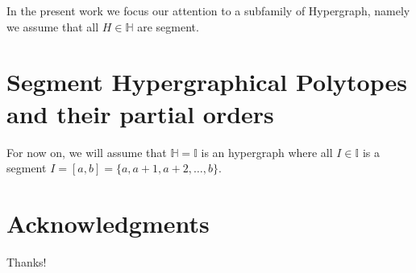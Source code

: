 \documentclass[reqno]{amsart}
\theoremstyle{definition}
\newcommand{\HH}{\mathbb H}  %
\newcommand{\II}{\mathbb I} %
\begin{document}
In the present work we focus our attention to a subfamily of Hypergraph, namely we assume that all $H\in \HH$ are segment.

\section{Segment Hypergraphical Polytopes and their partial orders}
\label{sec:IHP}

For now on, we will assume that $\HH=\II$ is an hypergraph where all $I\in \II$ is a segment $I=[a,b]=\{a,a+1,a+2,\ldots,b\}$.


\section*{Acknowledgments}

Thanks!



\label{sec:biblio}

\end{document}
